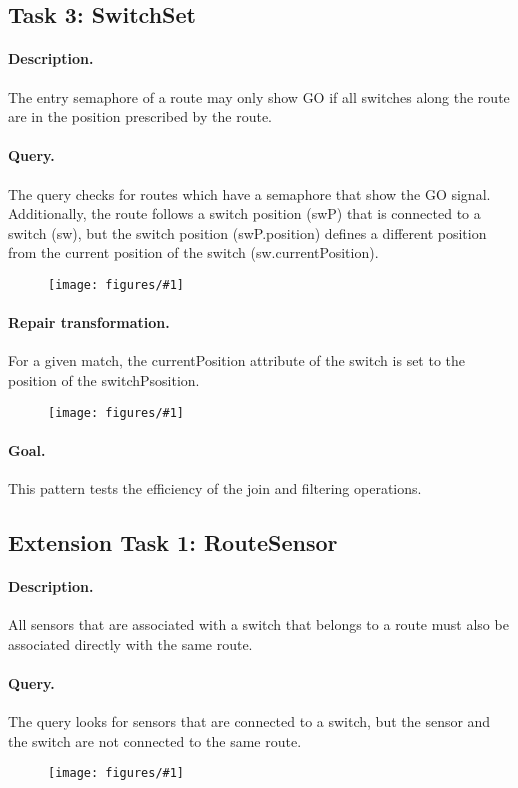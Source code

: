 \documentclass[submission,copyright,creativecommons]{eptcs}
\newcommand{\ttcpattern}[1]{
\begin{figure}[H] 
	\centering
	\texttt{[image: figures/\#1]}
\end{figure}}
\begin{document}
\subsection{Task 3: SwitchSet}
\label{switchset}
\paragraph{Description.} The entry semaphore of a route may only show GO if all switches along the route are in the position prescribed by the route.
\paragraph{Query.} The query checks for routes which have a semaphore that show the GO signal. Additionally, the route follows a switch position (\textsf{swP}) that is connected to a switch (\textsf{sw}), but the switch position (\textsf{swP.position}) defines a different position from the current position of the switch (\textsf{sw.currentPosition}). 
\ttcpattern{pattern-switchset}
\paragraph{Repair transformation.} For a given match, the \textsf{currentPosition} attribute of the \textsf{switch} is set to the \textsf{position} of the \textsf{switchPsosition}. 
\ttcpattern{transformation-switchset}
\paragraph{Goal.} This pattern tests the efficiency of the join and filtering operations.


\subsection{Extension Task 1: RouteSensor}
\label{routesensor}
\paragraph{Description.} All sensors that are associated with a switch that belongs to a route must also be associated directly with the same route.
\paragraph{Query.} The query looks for sensors that are connected to a switch, but the sensor and the switch are not connected to the same route.
\ttcpattern{pattern-routesensor}
\end{document}
